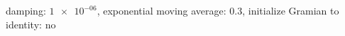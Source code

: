 damping: $\num[scientific-notation=true]{1e-06}$, exponential moving average: $\num[scientific-notation=true]{0.3}$, initialize Gramian to identity: $\text{no}$
